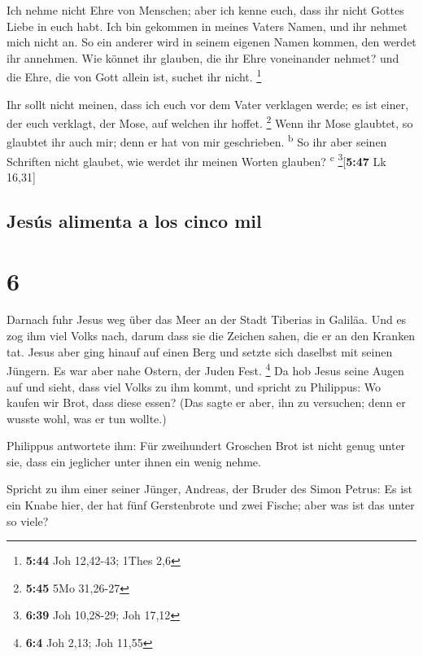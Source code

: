  Ich nehme nicht Ehre von Menschen;  aber
ich kenne euch, dass ihr nicht Gottes Liebe in euch habt.
 Ich bin gekommen in meines Vaters Namen, und ihr nehmet
mich nicht an. So ein anderer wird in seinem eigenen Namen kommen, den
werdet ihr annehmen.  Wie könnet ihr glauben, die ihr
Ehre voneinander nehmet? und die Ehre, die von Gott allein ist, suchet
ihr nicht. \footnote{\textbf{5:44} Joh 12,42-43; 1Thes 2,6}

 Ihr sollt nicht meinen, dass ich euch vor dem Vater
verklagen werde; es ist einer, der euch verklagt, der Mose, auf welchen
ihr hoffet. \footnote{\textbf{5:45} 5Mo 31,26-27}  Wenn
ihr Mose glaubtet, so glaubtet ihr auch mir; denn er hat von mir
geschrieben. \textsuperscript{b}  So ihr aber seinen
Schriften nicht glaubet, wie werdet ihr meinen Worten glauben?
\textsuperscript{c} \footnote{\textbf{6:39} Joh 10,28-29; Joh 17,12}{[}\textbf{5:47}
Lk 16,31{]}

\hypertarget{jesuxfas-alimenta-a-los-cinco-mil}{%
\subsection{Jesús alimenta a los cinco
mil}\label{jesuxfas-alimenta-a-los-cinco-mil}}

\hypertarget{section-5}{%
\section{6}\label{section-5}}

 Darnach fuhr Jesus weg über das Meer an der Stadt
Tiberias in Galiläa.  Und es zog ihm viel Volks nach,
darum dass sie die Zeichen sahen, die er an den Kranken tat.
 Jesus aber ging hinauf auf einen Berg und setzte sich
daselbst mit seinen Jüngern.  Es war aber nahe Ostern, der
Juden Fest. \footnote{\textbf{6:4} Joh 2,13; Joh 11,55} 
Da hob Jesus seine Augen auf und sieht, dass viel Volks zu ihm kommt,
und spricht zu Philippus: Wo kaufen wir Brot, dass diese essen?
 (Das sagte er aber, ihn zu versuchen; denn er wusste
wohl, was er tun wollte.)

 Philippus antwortete ihm: Für zweihundert Groschen Brot
ist nicht genug unter sie, dass ein jeglicher unter ihnen ein wenig
nehme.

 Spricht zu ihm einer seiner Jünger, Andreas, der Bruder
des Simon Petrus:  Es ist ein Knabe hier, der hat fünf
Gerstenbrote und zwei Fische; aber was ist das unter so viele?

